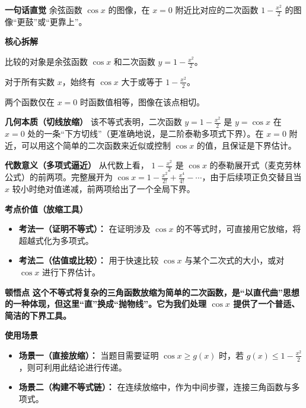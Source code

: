 \begin{explanationbox}
\textbf{\textcolor{CExplanation}{一句话直觉}}
余弦函数 $\cos x$ 的图像，在 $x=0$ 附近比对应的二次函数 $1-\frac{x^2}{2}$ 的图像“更鼓”或“更靠上”。

\medskip
\textbf{\textcolor{CExplanation}{核心拆解}}
\begin{description}[style=nextline, leftmargin=2.8em, labelsep=0.5em, itemsep=0.45em]
    \item[\textbf{要点一（比较对象）：}] 比较的对象是余弦函数 $\cos x$ 和二次函数 $y = 1 - \frac{x^2}{2}$。
    \item[\textbf{要点二（不等关系）：}] 对于所有实数 $x$，始终有 $\cos x$ 大于或等于 $1 - \frac{x^2}{2}$。
    \item[\textbf{要点三（相切条件）：}] 两个函数仅在 $x=0$ 时函数值相等，图像在该点相切。
\end{description}

\medskip
\textbf{\textcolor{CExplanation}{几何本质（切线放缩）}}
该不等式表明，二次函数 $y=1-\frac{x^2}{2}$ 是 $y=\cos x$ 在 $x=0$ 处的一条“下方切线”（更准确地说，是二阶泰勒多项式下界）。在 $x=0$ 附近，可以用这个简单的二次函数来近似或控制 $\cos x$ 的值，且保证是下界估计。

\medskip
\textbf{\textcolor{CExplanation}{代数意义（多项式逼近）}}
从代数上看， $1-\frac{x^2}{2}$ 是 $\cos x$ 的泰勒展开式（麦克劳林公式）的前两项。完整展开为 $\cos x = 1 - \frac{x^2}{2!} + \frac{x^4}{4!} - \cdots$，由于后续项正负交替且当 $x$ 较小时绝对值递减，前两项给出了一个全局下界。

\medskip
\textbf{\textcolor{CExplanation}{考点价值（放缩工具）}}
\begin{itemize}[leftmargin=*, itemsep=0.5em, topsep=0.4em]
    \item \textbf{考法一（证明不等式）：} 在证明涉及 $\cos x$ 的不等式时，可直接用它放缩，将超越式化为多项式。
    \item \textbf{考法二（估值或比较）：} 用于快速比较 $\cos x$ 与某个二次式的大小，或对 $\cos x$ 进行下界估计。
\end{itemize}

\medskip
\textbf{\textcolor{CExplanation}{顿悟点}}
\textbf{这个不等式将复杂的三角函数放缩为简单的二次函数，是“以直代曲”思想的一种体现，但这里“直”换成“抛物线”。它为我们处理 $\cos x$ 提供了一个普适、简洁的下界工具。}

\medskip
\textbf{\textcolor{CExplanation}{使用场景}}
\begin{itemize}[leftmargin=*, itemsep=0.5em, topsep=0.4em]
    \item \textbf{场景一（直接放缩）：} 当题目需要证明 $\cos x \ge g(x)$ 时，若 $g(x) \le 1-\frac{x^2}{2}$，则可利用此结论进行传递。
    \item \textbf{场景二（构建不等式链）：} 在连续放缩中，作为中间步骤，连接三角函数与多项式。
\end{itemize}
\end{explanationbox}
